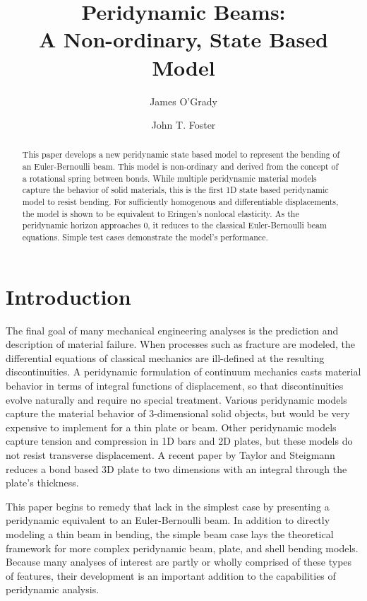 \documentclass[11pt]{amsart}
\title{Peridynamic Beams: \\ A Non-ordinary, State Based Model}
\author{James O'Grady \and John T. Foster}
\begin{document}
\begin{abstract}
This paper develops a new peridynamic state based model to represent the bending of an Euler-Bernoulli beam.
This model is non-ordinary and derived from the concept of a rotational spring between bonds.
While multiple peridynamic material models capture the behavior of solid materials, this is the first 1D state based peridynamic model to resist bending.
For sufficiently homogenous and differentiable displacements, the model is shown to be equivalent to Eringen's nonlocal elasticity.
As the peridynamic horizon approaches 0, it reduces to the classical Euler-Bernoulli beam equations.
Simple test cases demonstrate the model's performance.
\end{abstract}

\maketitle

\section{Introduction}
The final goal of many mechanical engineering analyses is the prediction and description of material failure.
When processes such as fracture are modeled, the differential equations of classical mechanics are ill-defined at the resulting discontinuities.
A peridynamic formulation of continuum mechanics casts material behavior in terms of integral functions of displacement, so that discontinuities evolve naturally and require no special treatment.
Various peridynamic models capture the material behavior of 3-dimensional solid objects, but would be very expensive to implement for a thin plate or beam.
Other peridynamic models capture tension and compression in 1D bars and 2D plates, but these models do not resist transverse displacement.
A recent paper by Taylor and Steigmann \cite{taylor2013two} reduces a bond based 3D plate to two dimensions with an integral through the plate's thickness.

This paper begins to remedy that lack in the simplest case by presenting a peridynamic equivalent to an Euler-Bernoulli beam.
In addition to directly modeling a thin beam in bending, the simple beam case lays the theoretical framework for more complex peridynamic beam, plate, and shell bending models.
Because many analyses of interest are partly or wholly comprised of these types of features, their development is an important addition to the capabilities of peridynamic analysis.
\end{document}
